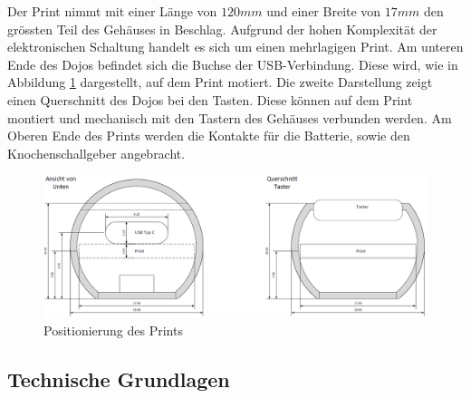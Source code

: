 Der Print nimmt mit einer Länge von $120mm$ und einer Breite von $17mm$ den grössten Teil des Gehäuses in Beschlag. Aufgrund der hohen Komplexität der elektronischen Schaltung handelt es sich um einen mehrlagigen Print. Am unteren Ende des Dojos befindet sich die Buchse der USB-Verbindung. Diese wird, wie in Abbildung \ref{fig:DojoPrintQuerschnitt} dargestellt, auf dem Print motiert. Die zweite Darstellung zeigt einen Querschnitt des Dojos bei den Tasten. Diese können auf dem Print montiert und mechanisch mit den Tastern des Gehäuses verbunden werden. Am Oberen Ende des Prints werden die Kontakte für die Batterie, sowie den Knochenschallgeber angebracht.

\begin{figure}[h]
	\centering
	\includegraphics[width=\textwidth]{graphics/DojoPrintQuerschnitt.png}
	\caption{Positionierung des Prints}
	\label{fig:DojoPrintQuerschnitt}
\end{figure}

\newpage

\subsection{Technische Grundlagen}
